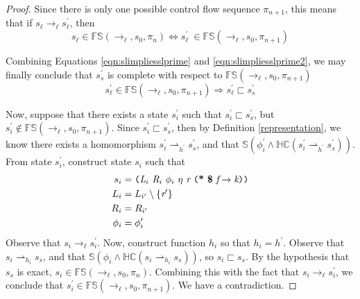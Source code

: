 \begin{proof}
Since there is only one possible control flow sequence $\pi_{n+1}$, this means that if $s_\ell \rightarrow_\ell s_\ell^\prime$, then 
\begin{equation}
\label{eqn:slimpliesslprime2}
s_\ell \in \mathbb{FS}(\rightarrow_{\ell},s_0,\pi_n) \Leftrightarrow s_\ell^\prime\ \in \mathbb{FS}(\rightarrow_{\ell},s_0,\pi_{n+1})
\end{equation}

Combining Equations \ref{eqn:slimpliesslprime} and \ref{eqn:slimpliesslprime2}, we may finally conclude that $s_s^\prime$ is complete with respect to $\mathbb{FS}(\rightarrow_{\ell},s_0,\pi_{n+1})$
\begin{equation}
\label{eqn:readforwards}
s_\ell^\prime \in \mathbb{FS}(\rightarrow_{\ell},s_0,\pi_{n+1}) \Rightarrow s_\ell^\prime \sqsubset s_s^\prime
\end{equation}


Now, suppose that there exists a state $s_i^\prime$ such that $s_i^\prime \sqsubset s_s^\prime$, but $s_i^\prime \notin \mathbb{FS}(\rightarrow_{\ell},s_0,\pi_{n+1})$. Since $s_i^\prime \sqsubset s_s^\prime$, then by Definition \ref{representation}, we know there exists a homomorphism $s_i^\prime \rightharpoonup_{h^\prime} s_s^\prime$, and that $\mathbb{S}( \phi_i^\prime \wedge \mathbb{HC}(s_i^\prime \rightharpoonup_{h^\prime} s_s^\prime) )$. From state $s_i^\prime$, construct state $s_i$ such that 
\begin{align*}
s_i &= \lp \cfgnt{L}_{i}\ \cfgnt{R}_{i}\ \phi_i\ \eta\ \cfgnt{r}\ \lp \cfgt{*}\ \cfgt{\$}\ \cfgnt{f} \rightarrow \cfgnt{k}\rp \rp\\
L_i &= L_{i^\prime} \setminus \{\cfgnt{r}^\prime \}\\
R_i &= R_{i^\prime}\\
\phi_i &= \phi_i^\prime
\end{align*}
Observe that $s_i \rightarrow_\ell s_i^\prime$. Now, construct function $h_i$ so that $h_i = h^\prime$. Observe that $s_i \rightharpoonup_{h_i} s_s$, and that $\mathbb{S}( \phi_i \wedge \mathbb{HC}(s_i \rightharpoonup_{h_i} s_s) )$, so $s_i \sqsubset s_s$. By the hypothesis that $s_s$ is exact, $s_i \in\mathbb{FS}(\rightarrow_{\ell},s_0,\pi_n)$. Combining this with the fact that $s_i \rightarrow_\ell s_i^\prime$, we conclude that $s_i^\prime \in \mathbb{FS}(\rightarrow_{\ell},s_0,\pi_{n+1})$. We have a contradiction.


\end{proof}
